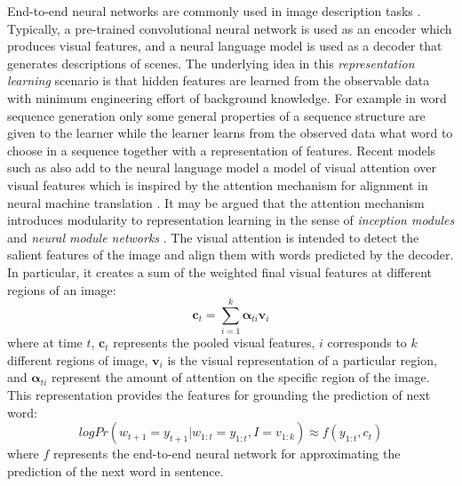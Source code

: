 End-to-end neural networks are commonly used in image description tasks
\cite{vinyals2015show,xu2015show,lu2017knowing}. Typically, a pre-trained
convolutional neural network is used as an encoder which produces visual
features, and a neural language model is used as a decoder that generates
descriptions of scenes. The underlying idea in this
\emph{representation learning} scenario \cite{bengio2013representation} is that
hidden features are learned from the observable data with minimum engineering
effort of background knowledge. For example in word sequence generation only
some general properties of a sequence structure \cite{sutskever2014sequence}
are given to the learner while the learner learns from the observed data what
word to choose in a sequence together with a representation of features. Recent
models such as \cite{xu2015show,lu2017knowing} also add to the neural language
model a model of visual attention over visual features which is inspired by the
attention mechanism for alignment in neural machine translation \cite{bahdanau2014neural}.
It may be argued that the attention mechanism introduces modularity to
representation learning in the sense of \emph{inception modules}
\cite{szegedy2015going} and \emph{neural module networks}
\cite{andreas2016neural}. The visual attention is intended to detect the
salient features of the image and align them with words predicted by the
decoder. In particular, it creates a sum of the weighted final visual features at
different regions of an image:
\begin{equation}\label{sivl2018:eq:spatialatt}
\bm{c}_t = \sum_{i=1}^k \bm{\alpha}_{ti} \bm{v}_{i}
\end{equation}
where at time $t$, $\bm{c}_t$ represents the pooled visual features, $i$
corresponds to $k$ different regions of image, $\bm{v}_{i}$ is the visual
representation of a particular region, and $\bm{\alpha}_{ti}$ represent the
amount of attention on the specific region of the image. This representation
provides the features for grounding the prediction of next word:
\begin{equation}\label{sivl2018:eq:grounding}
log Pr(w_{t+1} = y_{t+1} | w_{1:t} = y_{1:t}, I=v_{1:k}) \approx f(y_{1:t}, c_{t})
\end{equation}
where $f$ represents the end-to-end neural network for approximating the
prediction of the next word in sentence.

